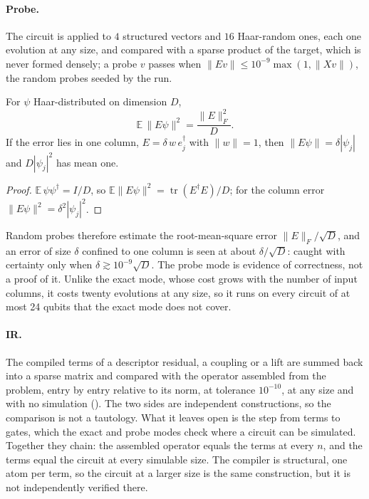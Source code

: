 \paragraph{Probe.} The circuit is applied to $4$ structured vectors and $16$ Haar-random ones, each one evolution at any size, and compared with a sparse product of the target, which is never formed densely; a probe $v$ passes when $\|Ev\|\le10^{-9}\max(1,\|Xv\|)$, the random probes seeded by the run.

\begin{proposition}
\label{prop:haar-probes}
For $\psi$ Haar-distributed on dimension $D$,
\begin{equation*}
    \mathbb{E}\,\|E\psi\|^2=\frac{\|E\|_F^2}{D}.
\end{equation*}
If the error lies in one column, $E=\delta\,w\,e_j^\dagger$ with $\|w\|=1$, then $\|E\psi\|=\delta|\psi_j|$ and $D|\psi_j|^2$ has mean one.
\end{proposition}
\begin{proof}
$\mathbb{E}\,\psi\psi^\dagger=I/D$, so $\mathbb{E}\|E\psi\|^2=\operatorname{tr}(E^\dagger E)/D$; for the column error $\|E\psi\|^2=\delta^2|\psi_j|^2$.
\end{proof}

Random probes therefore estimate the root-mean-square error $\|E\|_F/\sqrt D$, and an error of size $\delta$ confined to one column is seen at about $\delta/\sqrt D$: caught with certainty only when $\delta\gtrsim10^{-9}\sqrt D$. The probe mode is evidence of correctness, not a proof of it. Unlike the exact mode, whose cost grows with the number of input columns, it costs twenty evolutions at any size, so it runs on every circuit of at most 24 qubits that the exact mode does not cover.

\paragraph{IR.} The compiled terms of a descriptor residual, a coupling or a lift are summed back into a sparse matrix and compared with the operator assembled from the problem, entry by entry relative to its norm, at tolerance $10^{-10}$, at any size and with no simulation (). The two sides are independent constructions, so the comparison is not a tautology. What it leaves open is the step from terms to gates, which the exact and probe modes check where a circuit can be simulated. Together they chain: the assembled operator equals the terms at every $n$, and the terms equal the circuit at every simulable size. The compiler is structural, one atom per term, so the circuit at a larger size is the same construction, but it is not independently verified there.

